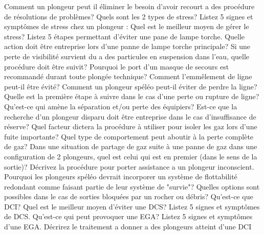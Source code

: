 \documentclass[english,1pt,a4paper]{article}
\begin{document}
	\begin{outline}
		\1 Comment un plongeur peut il éliminer le besoin d’avoir recourt a des procédure de résolutions de problèmes?	\vspace{2cm}
		\1 Quels sont les 2 types de stress?	\vspace{2cm}
		\1 Listez 5 signes et symptômes de stress chez un plongeur :	\vspace{2cm}
		\1 Quel est le meilleur moyen de gérer le stress?	\vspace{2cm}
		\1 Listez 5 étapes permettant d’éviter une pane de lampe torche.	\vspace{2cm}
		\1 Quelle action doit être entreprise lors d’une panne de lampe torche principale?	\vspace{2cm}
		\1 Si une perte de visibilité survient du a des particules en suspension dans l’eau, quelle procédure doit être suivit?	\vspace{2cm}
		\1 Pourquoi le port d’un masque de secours est recommandé durant toute plongée technique?	\vspace{2cm}
		\1 Comment l’emmêlement de ligne peut-il être évité?	\vspace{2cm}
		\1 Comment un plongeur spéléo peut-il éviter de perdre la ligne?	\vspace{2cm}
		\1 Quelle est la première étape à suivre dans le cas d’une perte ou rupture de ligne?	\vspace{2cm}
		\1 Qu’est-ce qui amène la séparation et/ou perte des équipiers?	\vspace{2cm}
		\1 Est-ce que la recherche d’un plongeur disparu doit être entreprise dans le cas d’insuffisance de réserve?	\vspace{2cm}
		\1 Quel facteur dictera la procédure à utiliser pour isoler les gaz lors d’une fuite importante?	\vspace{2cm}
		\1 Quel type de comportement peut aboutir à la perte complète de gaz?	\vspace{2cm}
		\1 Dans une situation de partage de gaz suite à une panne de gaz dans une configuration de 2 plongeurs, quel est celui qui est en premier (dans le sens de la sortie)?	\vspace{2cm}
		\1 Décrivez la procédure pour porter assistance a un plongeur inconscient.	\vspace{2cm}
		\1 Pourquoi les plongeurs spéléo devrait incorporer un système de flottabilité redondant comme faisant partie de leur système de "survie"?	\vspace{2cm}
		\1 Quelles options sont possibles dans le cas de sorties bloquées par un rocher ou débris?	\vspace{2cm}
		\1 Qu’est-ce que DCI?	\vspace{2cm}
		\1 Quel est le meilleur moyen d’éviter une DCS?	\vspace{2cm}
		\1 Listez 5 signes et symptômes de DCS.	\vspace{2cm}
		\1 Qu’est-ce qui peut provoquer une EGA?	\vspace{2cm}
		\1 Listez 5 signes et symptômes d’une EGA.	\vspace{2cm}
		\1 Décrirez le traitement a donner a des plongeurs atteint d’une DCI	\vspace{2cm}
	\end{outline}
\end{document}
